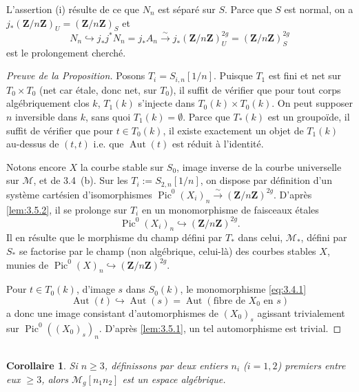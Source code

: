 \documentclass[12pt,a4paper]{article}
\theoremstyle{plain}
\newtheorem{corollary}[theorem]{Corollaire}
\theoremstyle{definition}
\theoremstyle{remark}
\DeclareMathOperator{\Pic}{Pic}
\DeclareMathOperator{\Aut}{Aut}
\begin{document}
L'assertion (i) résulte de ce que $N_n$ est séparé sur $S$. Parce que $S$ est normal, on a $j_* (\mathbf{Z}/n\mathbf{Z})_U = (\mathbf{Z}/n\mathbf{Z})_S$ et
\[
N_n \hookrightarrow j_* j^* N_n = j_* A_n \xrightarrow{\sim} j_* (\mathbf{Z}/n\mathbf{Z})^{2g}_U = (\mathbf{Z}/n\mathbf{Z})^{2g}_S
\]
est le prolongement cherché.

\begin{proof}[Preuve de la Proposition]
Posons $T_i = S_{i,n}[1/n]$. Puisque $T_1$ est fini et net sur $T_0 \times T_0$ (net car étale, donc net, sur $T_0$), il suffit de vérifier que pour tout corps algébriquement clos $k$, $T_1(k)$ s'injecte dans $T_0(k) \times T_0(k)$. On peut supposer $n$ inversible dans $k$, sans quoi $T_1(k) = \emptyset$. Parce que $T_*(k)$ est un groupoïde, il suffit de vérifier que pour $t \in T_0(k)$, il existe exactement un objet de $T_1(k)$ au-dessus de $(t,t)$ i.e. que $\Aut(t)$ est réduit à l'identité.

Notons encore $X$ la courbe stable sur $S_0$, image inverse de la courbe universelle sur $\mathcal{M}$, et de 3.4~(b). Sur les $T_i := S_{2,n}[1/n]$, on dispose par définition d'un système cartésien d'isomorphismes $\Pic^0(X_i)_n \xrightarrow{\sim} (\mathbf{Z}/n\mathbf{Z})^{2g}$. D'après \ref{lem:3.5.2}, il se prolonge sur $T_i$ en un monomorphisme de faisceaux étales
\[
\Pic^0(X_i)_n \hookrightarrow (\mathbf{Z}/n\mathbf{Z})^{2g}.
\]
Il en résulte que le morphisme du champ défini par $T_*$ dans celui, $\mathcal{M}_*$, défini par $S_*$ se factorise par le champ (non algébrique, celui-là) des courbes stables $X$, munies de $\Pic^0(X)_n \hookrightarrow (\mathbf{Z}/n\mathbf{Z})^{2g}$.

Pour $t \in T_0(k)$, d'image $s$ dans $S_0(k)$, le monomorphisme \eqref{eq:3.4.1}
\[
\Aut(t) \hookrightarrow \Aut(s) = \Aut(\text{fibre de } X_0 \text{ en } s)
\]
a donc une image consistant d'automorphismes de $(X_0)_s$ agissant trivialement sur $\Pic^0((X_0)_s)_n$. D'après \ref{lem:3.5.1}, un tel automorphisme est trivial.
\end{proof}

\subsection{}

\begin{corollary}
Si $n \geq 3$, définissons par deux entiers $n_i$ ($i = 1,2$) premiers entre eux $\geq 3$, alors $\mathcal{M}_g[n_1 n_2]$ est un espace algébrique.
\end{corollary}
\end{document}
